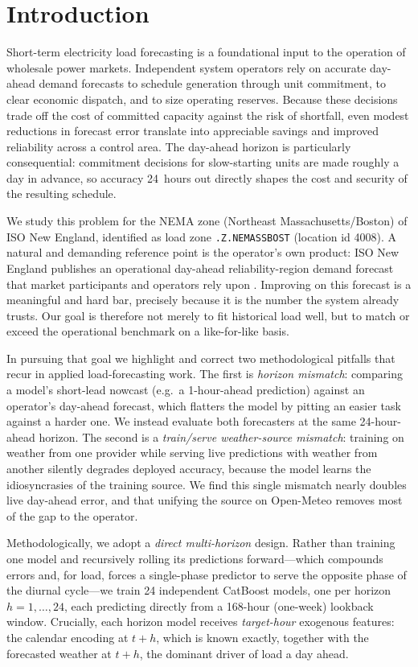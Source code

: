 \section{Introduction}\label{sec:intro}

Short-term electricity load forecasting is a foundational input to the operation
of wholesale power markets. Independent system operators rely on accurate
day-ahead demand forecasts to schedule generation through unit commitment, to
clear economic dispatch, and to size operating reserves. Because these decisions
trade off the cost of committed capacity against the risk of shortfall, even
modest reductions in forecast error translate into appreciable savings and
improved reliability across a control area. The day-ahead horizon is
particularly consequential: commitment decisions for slow-starting units are
made roughly a day in advance, so accuracy 24~hours out directly shapes the cost
and security of the resulting schedule.

We study this problem for the NEMA zone (Northeast Massachusetts/Boston) of ISO
New England, identified as load zone \texttt{.Z.NEMASSBOST} (location id 4008).
A natural and demanding reference point is the operator's own product: ISO New
England publishes an operational day-ahead reliability-region demand forecast
that market participants and operators rely upon \cite{isone}. Improving on this
forecast is a meaningful and hard bar, precisely because it is the number the
system already trusts. Our goal is therefore not merely to fit historical load
well, but to match or exceed the operational benchmark on a like-for-like basis.

In pursuing that goal we highlight and correct two methodological pitfalls that
recur in applied load-forecasting work. The first is \emph{horizon mismatch}:
comparing a model's short-lead nowcast (e.g.\ a 1-hour-ahead prediction) against
an operator's day-ahead forecast, which flatters the model by pitting an easier
task against a harder one. We instead evaluate both forecasters at the same
24-hour-ahead horizon. The second is a \emph{train/serve weather-source
mismatch}: training on weather from one provider while serving live predictions
with weather from another silently degrades deployed accuracy, because the model
learns the idiosyncrasies of the training source. We find this single mismatch
nearly doubles live day-ahead error, and that unifying the source on Open-Meteo
\cite{openmeteo} removes most of the gap to the operator.

Methodologically, we adopt a \emph{direct multi-horizon} design. Rather than
training one model and recursively rolling its predictions forward---which
compounds errors and, for load, forces a single-phase predictor to serve the
opposite phase of the diurnal cycle---we train 24 independent CatBoost
\cite{prokhorenkova2018catboost} models, one per horizon $h=1,\dots,24$, each
predicting directly from a 168-hour (one-week) lookback window. Crucially, each
horizon model receives \emph{target-hour} exogenous features: the calendar
encoding at $t{+}h$, which is known exactly, together with the forecasted
weather at $t{+}h$, the dominant driver of load a day ahead.

